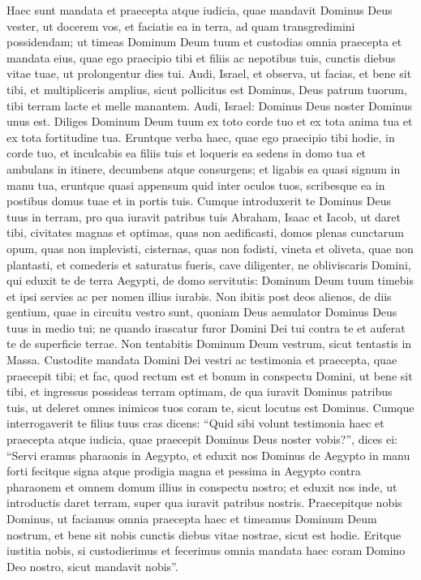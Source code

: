 \begin{biblechapter}
\begin{biblechapter}
\begin{biblechapter}
\begin{biblechapter}
\begin{biblechapter}
\begin{biblechapter}
\verse Haec sunt mandata et praecepta atque iudicia, quae mandavit Dominus Deus vester, ut docerem vos, et faciatis ea in terra, ad quam transgredimini possidendam; 
\verse ut timeas Dominum Deum tuum et custodias omnia praecepta et mandata eius, quae ego praecipio tibi et filiis ac nepotibus tuis, cunctis diebus vitae tuae, ut prolongentur dies tui. 
\verse Audi, Israel, et observa, ut facias, et bene sit tibi, et multipliceris amplius, sicut pollicitus est Dominus, Deus patrum tuorum, tibi terram lacte et melle manantem.
 \verse Audi, Israel: Dominus Deus noster Dominus unus est. 
\verse Diliges Dominum Deum tuum ex toto corde tuo et ex tota anima tua et ex tota fortitudine tua. 
\verse Eruntque verba haec, quae ego praecipio tibi hodie, in corde tuo, 
\verse et inculcabis ea filiis tuis et loqueris ea sedens in domo tua et ambulans in itinere, decumbens atque consurgens; 
\verse et ligabis ea quasi signum in manu tua, eruntque quasi appensum quid inter oculos tuos, 
\verse scribesque ea in postibus domus tuae et in portis tuis.
 \verse Cumque introduxerit te Dominus Deus tuus in terram, pro qua iuravit patribus tuis Abraham, Isaac et Iacob, ut daret tibi, civitates magnas et optimas, quas non aedificasti, 
\verse domos plenas cunctarum opum, quas non implevisti, cisternas, quas non fodisti, vineta et oliveta, quae non plantasti, et comederis et saturatus fueris, 
\verse cave diligenter, ne obliviscaris Domini, qui eduxit te de terra Aegypti, de domo servitutis: 
\verse Dominum Deum tuum timebis et ipsi servies ac per nomen illius iurabis.
 \verse Non ibitis post deos alienos, de diis gentium, quae in circuitu vestro sunt, 
\verse quoniam Deus aemulator Dominus Deus tuus in medio tui; ne quando irascatur furor Domini Dei tui contra te et auferat te de superficie terrae. 
 \verse Non tentabitis Dominum Deum vestrum, sicut tentastis in Massa. 
\verse Custodite mandata Domini Dei vestri ac testimonia et praecepta, quae praecepit tibi; 
\verse et fac, quod rectum est et bonum in conspectu Domini, ut bene sit tibi, et ingressus possideas terram optimam, de qua iuravit Dominus patribus tuis, 
\verse ut deleret omnes inimicos tuos coram te, sicut locutus est Dominus. 
 \verse Cumque interrogaverit te filius tuus cras dicens: “Quid sibi volunt testimonia haec et praecepta atque iudicia, quae praecepit Dominus Deus noster vobis?”, 
\verse dices ei: “Servi eramus pharaonis in Aegypto, et eduxit nos Dominus de Aegypto in manu forti 
\verse fecitque signa atque prodigia magna et pessima in Aegypto contra pharaonem et omnem domum illius in conspectu nostro; 
 \verse et eduxit nos inde, ut introductis daret terram, super qua iuravit patribus nostris. 
\verse Praecepitque nobis Dominus, ut faciamus omnia praecepta haec et timeamus Dominum Deum nostrum, et bene sit nobis cunctis diebus vitae nostrae, sicut est hodie. 
\verse Eritque iustitia nobis, si custodierimus et fecerimus omnia mandata haec coram Domino Deo nostro, sicut mandavit nobis”.
 

\end{biblechapter}
\end{biblechapter}
\end{biblechapter}
\end{biblechapter}
\end{biblechapter}
\end{biblechapter}

